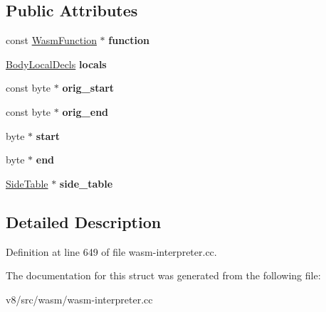 \subsection*{Public Attributes}
\begin{DoxyCompactItemize}
\item 
\mbox{\label{structv8_1_1internal_1_1wasm_1_1InterpreterCode_a671ceb8725eb586f42fd212df2396673}} 
const \mbox{\hyperlink{structv8_1_1internal_1_1wasm_1_1WasmFunction}{Wasm\+Function}} $\ast$ {\bfseries function}
\item 
\mbox{\label{structv8_1_1internal_1_1wasm_1_1InterpreterCode_ad0720ce55fcf219e9b3441b47316a2c6}} 
\mbox{\hyperlink{structv8_1_1internal_1_1wasm_1_1BodyLocalDecls}{Body\+Local\+Decls}} {\bfseries locals}
\item 
\mbox{\label{structv8_1_1internal_1_1wasm_1_1InterpreterCode_a9b507dcee6a16fd9c8585f5c0dd423a0}} 
const byte $\ast$ {\bfseries orig\+\_\+start}
\item 
\mbox{\label{structv8_1_1internal_1_1wasm_1_1InterpreterCode_af36e7a6a43882ece092c9258b0e011f9}} 
const byte $\ast$ {\bfseries orig\+\_\+end}
\item 
\mbox{\label{structv8_1_1internal_1_1wasm_1_1InterpreterCode_a61cce0f52890b19f54d11b6e5f773091}} 
byte $\ast$ {\bfseries start}
\item 
\mbox{\label{structv8_1_1internal_1_1wasm_1_1InterpreterCode_a849d9add5e74afb9a84ad68157c4cf71}} 
byte $\ast$ {\bfseries end}
\item 
\mbox{\label{structv8_1_1internal_1_1wasm_1_1InterpreterCode_a47fef5085dac15f7b99dab5cadcc0f6e}} 
\mbox{\hyperlink{classv8_1_1internal_1_1wasm_1_1SideTable}{Side\+Table}} $\ast$ {\bfseries side\+\_\+table}
\end{DoxyCompactItemize}


\subsection{Detailed Description}


Definition at line 649 of file wasm-\/interpreter.\+cc.



The documentation for this struct was generated from the following file\+:\begin{DoxyCompactItemize}
\item 
v8/src/wasm/wasm-\/interpreter.\+cc\end{DoxyCompactItemize}
